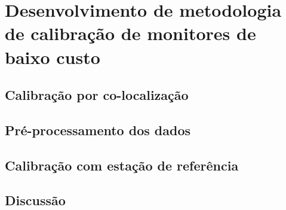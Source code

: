 \chapter{Desenvolvimento de metodologia de calibração de monitores de baixo custo}\label{cap:field-monit-results}

\section{Calibração por co-localização}

\section{Pré-processamento dos dados}



\section{Calibração com estação de referência}



\section{Discussão}